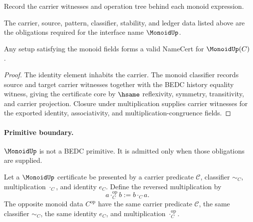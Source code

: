 \begin{definition}
\label{def:monoid-ledger-policy}
Record the carrier witnesses and operation tree behind each monoid expression.
\end{definition}

\begin{definition}
\label{def:monoid-certificate-obligations}
The carrier, source, pattern, classifier, stability, and ledger data listed above are the obligations required for the interface name \(\MonoidUp\).
\end{definition}

\begin{theorem}
\label{thm:concrete-monoid-namecert}
Any setup satisfying the monoid fields forms a valid NameCert for \(\MonoidUp(C)\).
\end{theorem}
\begin{proof}
The identity element inhabits the carrier. The monoid classifier records source and target carrier witnesses together with the BEDC history equality witness, giving the certificate core by \(\hsame\) reflexivity, symmetry, transitivity, and carrier projection. Closure under multiplication supplies carrier witnesses for the exported identity, associativity, and multiplication-congruence fields.
\end{proof}

\paragraph{Primitive boundary.}
\(\MonoidUp\) is not a BEDC primitive. It is admitted only when those obligations are supplied.

\begin{definition}
\label{def:opposite-monoid-certificate-data}
Let a $\MonoidUp$ certificate be presented by a carrier predicate $\mathcal C$, classifier $\sim_C$, multiplication $\cdot_C$, and identity $e_C$. Define the reversed multiplication by
$$
a\cdot_C^{\mathrm{op}} b:=b\cdot_C a.
$$
The opposite monoid data $C^{\mathrm{op}}$ have the same carrier predicate $\mathcal C$, the same classifier $\sim_C$, the same identity $e_C$, and multiplication $\cdot_C^{\mathrm{op}}$.
\end{definition}

